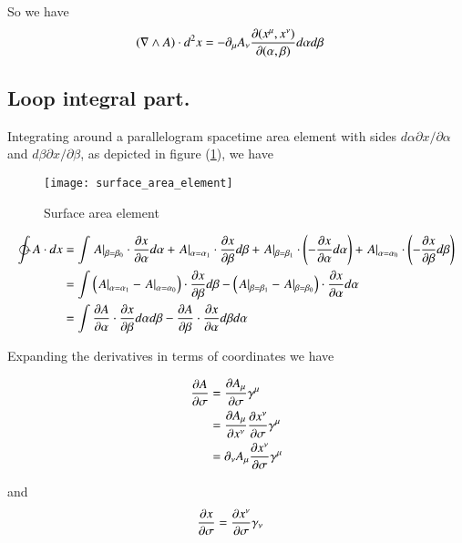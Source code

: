 So we have
\begin{align}\label{eqn:stokesGradeTwo:withJac}
( \grad \wedge A ) \cdot d^2 x &= -\partial_\mu A_\nu \frac{\partial (x^\mu, x^\nu)}{\partial (\alpha, \beta)} d\alpha d\beta
\end{align}

\subsection{Loop integral part.}

Integrating around a parallelogram spacetime area element with sides $d\alpha \partial x/\partial \alpha$ and $d\beta \partial x/\partial \beta$, as
depicted in figure (\ref{fig:surface_area_element}), we have

\begin{figure}[htp]
\centering
\texttt{[image: surface\_area\_element]}
\caption{Surface area element}\label{fig:surface_area_element}
\end{figure}

\begin{align*}
\ointctrclockwise 
A \cdot dx
&=
\int
{\left. A \right\vert}_{\beta=\beta_0} \cdot \PD{\alpha}{x} d\alpha
+ {\left. A \right\vert}_{\alpha=\alpha_1} \cdot \PD{\beta}{x} d\beta
+ {\left. A \right\vert}_{\beta=\beta_1} \cdot \left( -\PD{\alpha}{x} d\alpha \right)
+ {\left. A \right\vert}_{\alpha=\alpha_0} \cdot \left( -\PD{\beta}{x} d\beta \right) 
\\
&=
\int
\left( {\left. A \right\vert}_{\alpha=\alpha_1} - {\left. A \right\vert}_{\alpha=\alpha_0} \right) \cdot \PD{\beta}{x} d\beta
-\left( {\left. A \right\vert}_{\beta=\beta_1} - {\left. A \right\vert}_{\beta=\beta_0} \right) \cdot \PD{\alpha}{x} d\alpha 
\\
&=
\int
\PD{\alpha}{A} \cdot \PD{\beta}{x} d\alpha d\beta
-\PD{\beta}{A} \cdot \PD{\alpha}{x} d\beta d\alpha
\end{align*}

Expanding the derivatives in terms of coordinates we have

\begin{align*}
\PD{\sigma}{A} 
&=
\PD{\sigma}{A_\mu} \gamma^\mu \\
&= 
\PD{x^\nu}{A_\mu}\PD{\sigma}{x^\nu} \gamma^\mu \\
&= 
\partial_\nu A_\mu \PD{\sigma}{x^\nu} \gamma^\mu \\
\end{align*}

and
\begin{align*}
\PD{\sigma}{x} &= \PD{\sigma}{x^\nu} \gamma_\nu
\end{align*}

